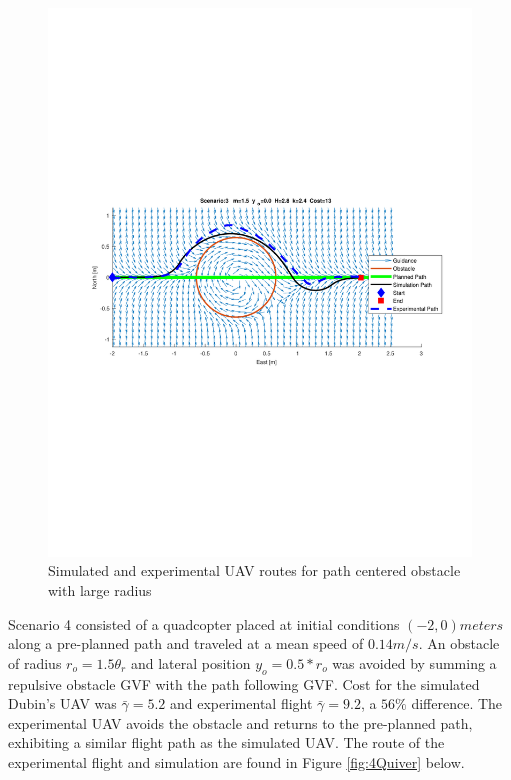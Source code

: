 \documentclass[numbered,pdftex]{ohio-etd}
\begin{document}
\begin{figure}[H]
	\centering
	\includegraphics[trim = 50 250 0 250, clip, width=16.5cm]{Figures/results/compareFigures/3Quiver}
	\caption{Simulated and experimental UAV routes for path centered obstacle with large radius}
	\label{fig:3Quiver}
\end{figure}

Scenario 4 consisted of a quadcopter placed at initial conditions $(-2,0) meters$ along a pre-planned path and traveled at a mean speed of $0.14 m/s$. An obstacle of radius $r_o = 1.5 \theta_r$ and lateral position $y_o=0.5*r_o$ was avoided by summing a repulsive obstacle GVF with the path following GVF. Cost for the simulated Dubin's UAV was $\bar{\gamma} = 5.2$ and experimental flight $\bar{\gamma} = 9.2$, a $56 \%$ difference. The experimental UAV avoids the obstacle and returns to the pre-planned path, exhibiting a similar flight path as the simulated UAV. The route of the experimental flight and simulation are found in Figure \ref{fig:4Quiver} below. 
\end{document}
